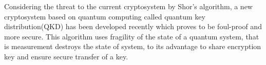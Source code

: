 Considering the threat to the current cryptosystem by Shor's algorithm, a new cryptosystem based on quantum computing called quantum key distribution(QKD) has been developed recently which proves to be foul-proof and more secure. This algorithm uses fragility of the state of a quantum system, that is measurement destroys the state of system, to its advantage to share encryption key and ensure secure transfer of a key.
